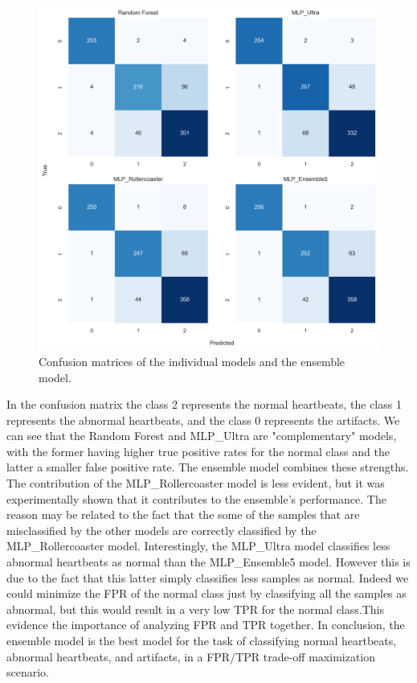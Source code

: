 \begin{figure}[H]
    \centering
    \includegraphics[width=1\columnwidth]{./images/confmat_ensemble_vs_individual.png}
    \caption{Confusion matrices of the individual models and the ensemble model.}
    \label{fig:confmat_ensemble_vs_individual}
\end{figure}

\noindent
In the confusion matrix the class 2 represents the normal heartbeats, the class 1 represents the 
abnormal heartbeats, and the class 0 represents the artifacts. 
We can see that the Random Forest and MLP\_Ultra are "complementary" models, with the former 
having higher true positive rates for the normal class and the latter a smaller false positive rate.
The ensemble model combines these strengths. The contribution of the MLP\_Rollercoaster model is
less evident, but it was experimentally shown that it contributes to the ensemble's performance.
The reason may be related to the fact that the some of the samples that are misclassified by the
other models are correctly classified by the MLP\_Rollercoaster model.\newline
Interestingly, the MLP\_Ultra model classifies less abnormal heartbeats as normal than the MLP\_Ensemble5 model.
However this is due to the fact that this latter simply classifies less samples as normal. Indeed we could minimize the 
FPR of the normal class just by classifying all the samples as abnormal, but this would result in a
very low TPR for the normal class.This evidence the importance of analyzing FPR and TPR together.
In conclusion, the ensemble model is the best model for the task of classifying normal heartbeats,
abnormal heartbeats, and artifacts, in a FPR/TPR trade-off maximization scenario.